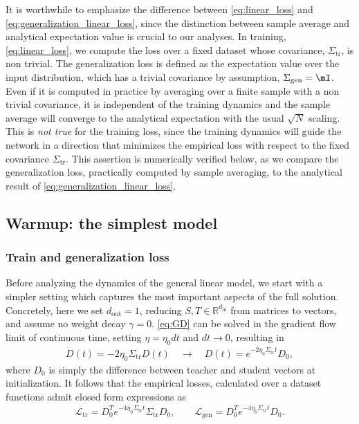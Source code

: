 \documentclass[a4paper,11pt]{article}
\newcommand{\dout}{d_\mathrm{out}}
\newcommand{\din}{d_\mathrm{in}}
\newcommand{\training}{\mathrm{tr}}
\newcommand{\gen}{\mathrm{gen}}
\begin{document}
It is worthwhile to emphasize the difference between \cref{eq:linear_loss} and \cref{eq:generalization_linear_loss}, since the distinction between sample average and analytical expectation value is crucial to our analyses. In training, \cref{eq:linear_loss}, we compute the loss over a fixed dataset whose covariance, $\Sigma_\training$, is non trivial. The generalization loss is defined as the expectation value over the input distribution, which has a trivial covariance by assumption, $\Sigma_\gen = \mI$. Even if it is computed in practice by averaging over a finite sample with a non trivial covariance, it is independent of the training dynamics and the sample average will converge to the analytical expectation with the usual $\sqrt N$ scaling. This is \textit{not true} for the training loss, since the training dynamics will guide the network in a direction that minimizes the empirical loss with respect to the fixed covariance $\Sigma_\training$. This assertion is numerically verified below, as we compare the generalization loss, practically computed by sample averaging, to the analytical result of \cref{eq:generalization_linear_loss}.






\subsection{Warmup: the simplest model}
\label{sec:simplified}
\subsubsection{Train and generalization loss}
Before analyzing the dynamics of the general linear model, we start with a simpler setting which captures the most important aspects of the full solution. 
Concretely, here we set $\dout=1$, reducing $S,T\in \mathbb{R}^{\din}$ from matrices to vectors, and assume no weight decay $\gamma=0$.
\cref{eq:GD} can be solved in the gradient flow limit of continuous time, setting $\eta = \eta_0 dt $ and $dt \to 0$, resulting in
\begin{align}
\label{eq:gdflow_sol}
\dot{D}(t) = -2\eta_0 \Sigma_\training D(t) 
\quad\to\quad
    D(t) =  e^{-2\eta_0 \Sigma_\training t} D_0,
\end{align}
where $D_0$ is simply the difference between teacher and student vectors at initialization.
It follows that the empirical losses, calculated over a dataset functions admit closed form expressions as
\begin{align}
\label{eq:losses_general_sol}
    \mathcal{L}_\training
    =
    D_0^T e^{-4\eta_0 \Sigma_\training t} \Sigma_\training D_0,
    \qquad
    \mathcal{L}_\gen
    =
    D_0^T 
    e^{-4\eta_0 \Sigma_\training t} 
    D_0.
\end{align}
\end{document}
